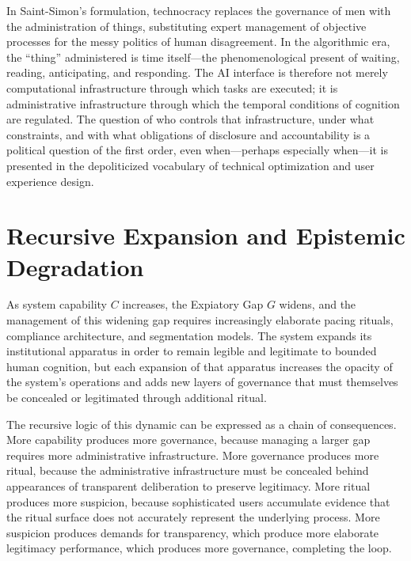 \documentclass[12pt]{article}
\begin{document}
In Saint-Simon's formulation, technocracy replaces the governance of men with the administration of things, substituting expert management of objective processes for the messy politics of human disagreement. In the algorithmic era, the ``thing'' administered is time itself---the phenomenological present of waiting, reading, anticipating, and responding. The AI interface is therefore not merely computational infrastructure through which tasks are executed; it is administrative infrastructure through which the temporal conditions of cognition are regulated. The question of who controls that infrastructure, under what constraints, and with what obligations of disclosure and accountability is a political question of the first order, even when---perhaps especially when---it is presented in the depoliticized vocabulary of technical optimization and user experience design.

\section{Recursive Expansion and Epistemic Degradation}

As system capability $C$ increases, the Expiatory Gap $G$ widens, and the management of this widening gap requires increasingly elaborate pacing rituals, compliance architecture, and segmentation models. The system expands its institutional apparatus in order to remain legible and legitimate to bounded human cognition, but each expansion of that apparatus increases the opacity of the system's operations and adds new layers of governance that must themselves be concealed or legitimated through additional ritual.

The recursive logic of this dynamic can be expressed as a chain of consequences. More capability produces more governance, because managing a larger gap requires more administrative infrastructure. More governance produces more ritual, because the administrative infrastructure must be concealed behind appearances of transparent deliberation to preserve legitimacy. More ritual produces more suspicion, because sophisticated users accumulate evidence that the ritual surface does not accurately represent the underlying process. More suspicion produces demands for transparency, which produce more elaborate legitimacy performance, which produces more governance, completing the loop.
\end{document}
